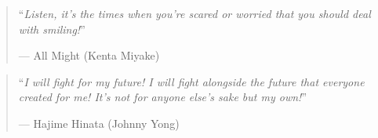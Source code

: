     

\cleardoublepage %

\begin{quote}
``\textit{Listen, it's the times when you're scared or worried that you should deal with smiling!}''

\raggedleft --- All Might (Kenta Miyake)
\end{quote}

\begin{quote}
``\textit{I will fight for my future! I will fight alongside the future that everyone created for me! It’s not for anyone else’s sake but my own!}''

\raggedleft --- Hajime Hinata (Johnny Yong)
\end{quote}


